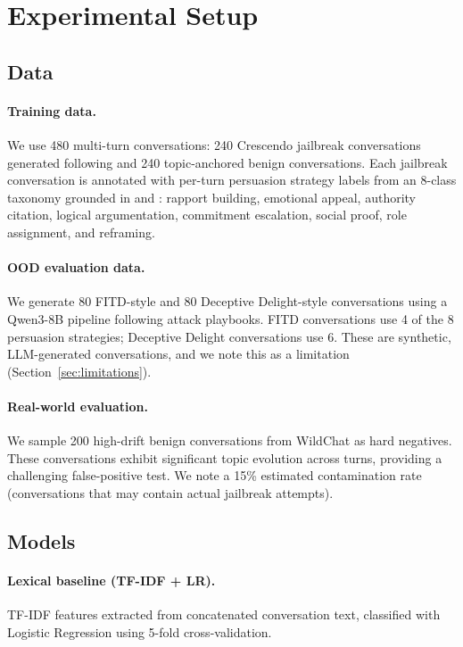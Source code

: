\documentclass[11pt]{article}
\begin{document}
\section{Experimental Setup}

\subsection{Data}

\paragraph{Training data.}
We use 480 multi-turn conversations: 240 Crescendo jailbreak conversations generated following \citet{russinovich2024crescendo} and 240 topic-anchored benign conversations. Each jailbreak conversation is annotated with per-turn persuasion strategy labels from an 8-class taxonomy grounded in \citet{zeng2024persuasion} and \citet{hagendorff2026persuasion}: rapport building, emotional appeal, authority citation, logical argumentation, commitment escalation, social proof, role assignment, and reframing.

\paragraph{OOD evaluation data.}
We generate 80 FITD-style \citep{jiang2024fitd} and 80 Deceptive Delight-style \citep{decdelight2024} conversations using a Qwen3-8B pipeline following attack playbooks. FITD conversations use 4 of the 8 persuasion strategies; Deceptive Delight conversations use 6. These are synthetic, LLM-generated conversations, and we note this as a limitation (Section~\ref{sec:limitations}).

\paragraph{Real-world evaluation.}
We sample 200 high-drift benign conversations from WildChat \citep{zhao2024wildchat} as hard negatives. These conversations exhibit significant topic evolution across turns, providing a challenging false-positive test. We note a 15\% estimated contamination rate (conversations that may contain actual jailbreak attempts).

\subsection{Models}

\paragraph{Lexical baseline (TF-IDF + LR).}
TF-IDF features extracted from concatenated conversation text, classified with Logistic Regression using 5-fold cross-validation.
\end{document}
